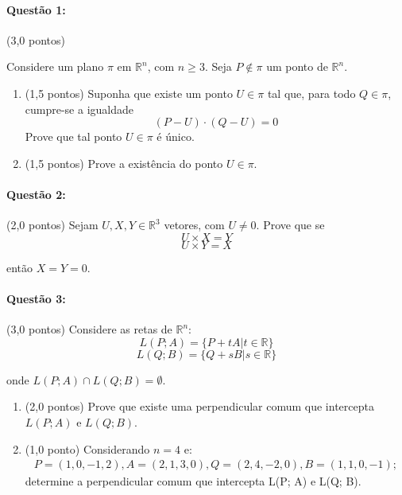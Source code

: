\documentclass[12pt,a4paper]{article}
\begin{document}
\paragraph{Questão 1:} (3,0 pontos)

Considere um plano $\pi$ em $\mathbb{R}^n$, com $n \geq 3$. Seja $P \notin \pi$ um ponto de $\mathbb{R}^n$.
\begin{enumerate}[label = (\alph*)]
    \item (1,5 pontos) Suponha que existe um ponto $U \in \pi$ tal que, para todo $Q \in \pi$, cumpre-se a igualdade 
    \begin{equation*}
        (P - U) \cdot (Q - U) = 0        
    \end{equation*}
    Prove que tal ponto $U\in \pi$ é único.

    \item (1,5 pontos) Prove a existência do ponto $U \in \pi$.
    
\end{enumerate} 

\paragraph{Questão 2:} (2,0 pontos) Sejam $U, X, Y \in \mathbb{R}^3$ vetores, com $U \neq 0$. Prove que se 
\begin{equation*}
    U \times X = Y
\end{equation*}
\begin{equation*}
      U \times Y = X 
\end{equation*}

então $X = Y = 0$.

\paragraph{Questão 3:} (3,0 pontos) Considere as retas de $\mathbb{R}^n$:
\begin{equation*}
    L(P; A) = \{P + tA | t \in \mathbb{R}\}
\end{equation*}
    \begin{equation*}
        L(Q; B) = \{Q + sB | s \in \mathbb{R}\}
    \end{equation*}

onde $L(P; A) \cap L(Q; B) = \emptyset$.

\begin{enumerate}[label = (\alph*)]
    \item (2,0 pontos) Prove que existe uma perpendicular comum que intercepta $L(P; A)$ e $L(Q; B)$.
    \item (1,0 ponto) Considerando $n = 4$ e:
    \begin{align*}
        P = (1, 0, -1, 2), A = (2, 1, 3, 0), Q = (2, 4,-2, 0), B = (1, 1, 0,-1);
    \end{align*}
    determine a perpendicular comum que intercepta L(P; A) e L(Q; B).
\end{enumerate}
\end{document}
